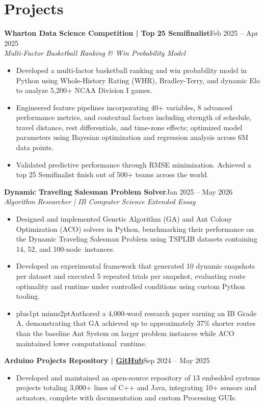 \documentclass[10pt,letterpaper]{article}
\newcommand{\entry}[4]{\textbf{#1}\hfill #2\\\textit{#3}\hfill\textit{#4}\par}
\begin{document}
\section{Projects}
\entry{Wharton Data Science Competition | Top 25 Semifinalist}{Feb 2025 -- Apr 2025}{Multi-Factor Basketball Ranking \& Win Probability Model}{}
\begin{itemize}
\item Developed a multi-factor basketball ranking and win probability model in Python using Whole-History Rating (WHR), Bradley-Terry, and dynamic Elo to analyze 5,200+ NCAA Division I games.
\item Engineered feature pipelines incorporating 40+ variables, 8 advanced performance metrics, and contextual factors including strength of schedule, travel distance, rest differentials, and time-zone effects; optimized model parameters using Bayesian optimization and regression analysis across 6M data points.
\item Validated predictive performance through RMSE minimization. Achieved a top 25 Semifinalist finish out of 500+ teams across the world.
\end{itemize}
\entry{Dynamic Traveling Salesman Problem Solver}{Jan 2025 -- May 2026}{Algorithm Researcher | IB Computer Science Extended Essay}{}
\begin{itemize}
\item Designed and implemented Genetic Algorithm (GA) and Ant Colony Optimization (ACO) solvers in Python, benchmarking their performance on the Dynamic Traveling Salesman Problem using TSPLIB datasets containing 14, 52, and \mbox{100-node instances.}
\item Developed an experimental framework that generated 10 dynamic snapshots per dataset and executed 5 repeated trials per snapshot, evaluating route optimality and runtime under controlled conditions using custom Python tooling.
\item {\spaceskip=3pt plus1pt minus2pt\relax Authored a 4,000-word research paper earning an IB Grade A, demonstrating that GA achieved up to approximately 37\% shorter routes than the baseline Ant System on larger problem instances while ACO maintained lower \mbox{computational runtime.}\par}
\end{itemize}
\textbf{Arduino Projects Repository | \href{https://github.com/eshangark/Arduino-Projects}{GitHub}}\hfill Sep 2024 -- May 2025\par
\begin{itemize}
\item Developed and maintained an open-source repository of 13 embedded systems projects totaling 3,000+ lines of C++ and Java, integrating 10+ sensors and actuators, complete with documentation and custom Processing GUIs.
\end{itemize}
\end{document}

